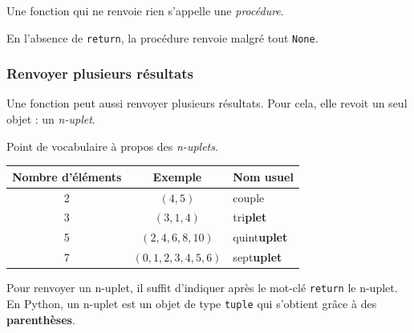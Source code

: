 \documentclass[a4paper,17pt]{extarticle}
\begin{document}
\begin{exemple}
        \end{exemple}\begin{remarque}
    Une fonction qui ne renvoie rien s'appelle une \emph{procédure}.

En l'absence de \texttt{return}, la procédure renvoie malgré tout
\texttt{None}.

        \end{remarque}
    \hypertarget{renvoyer-plusieurs-ruxe9sultats}{%
\subsubsection{Renvoyer plusieurs
résultats}\label{renvoyer-plusieurs-ruxe9sultats}}

    Une fonction peut aussi renvoyer plusieurs résultats. Pour cela, elle
revoit un seul objet : un \emph{n-uplet}.
\begin{remarque}
    Point de vocabulaire à propos des \emph{n-uplets}.

\begin{center}
    \begin{tabular}{|c|c|l|}\hline
        Nombre d'éléments & Exemple & Nom usuel \\ \hline
        2 & $(4, 5)$ & couple \\ \hline
        3 & $(3, 1, 4)$ & tri\textbf{plet} \\ \hline
        5 & $(2, 4, 6, 8, 10)$ & quint\textbf{uplet} \\ \hline
        7 & $(0, 1, 2, 3, 4, 5, 6)$ & sept\textbf{uplet} \\ \hline
    \end{tabular}
\end{center}

        \end{remarque}
    Pour renvoyer un n-uplet, il suffit d'indiquer après le mot-clé
\texttt{return} le n-uplet. En Python, un n-uplet est un objet de type
\texttt{tuple} qui s'obtient grâce à des \textbf{parenthèses}.
\end{document}
